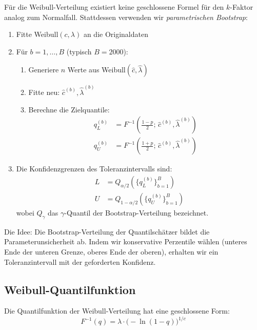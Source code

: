 \documentclass[10pt,a4paper,twocolumn]{article}
\theoremstyle{definition}
\newcommand{\TI}{Toleranzintervall}
\begin{document}
Für die Weibull-Verteilung existiert keine geschlossene Formel für
den $k$-Faktor analog zum Normalfall. Stattdessen verwenden wir
\emph{parametrischen Bootstrap}:

\begin{enumerate}[nosep,leftmargin=*]
    \item Fitte Weibull$(c, \lambda)$ an die Originaldaten
    \item Für $b = 1, \ldots, B$ (typisch $B = 2000$):
    \begin{enumerate}[nosep]
        \item Generiere $n$ Werte aus Weibull$(\hat{c}, \hat{\lambda})$
        \item Fitte neu: $\hat{c}^{(b)}, \hat{\lambda}^{(b)}$
        \item Berechne die Zielquantile:
            \begin{align}
                q_L^{(b)} &= F^{-1}\!\left(\frac{1-p}{2};\,
                    \hat{c}^{(b)}, \hat{\lambda}^{(b)}\right) \\
                q_U^{(b)} &= F^{-1}\!\left(\frac{1+p}{2};\,
                    \hat{c}^{(b)}, \hat{\lambda}^{(b)}\right)
            \end{align}
    \end{enumerate}
    \item Die Konfidenzgrenzen des \TI{}s sind:
        \begin{align}
            L &= Q_{\alpha/2}\!\left(\{q_L^{(b)}\}_{b=1}^B\right) \\
            U &= Q_{1-\alpha/2}\!\left(\{q_U^{(b)}\}_{b=1}^B\right)
            \label{eq:bootstrap_bounds}
        \end{align}
        wobei $Q_\gamma$ das $\gamma$-Quantil der Bootstrap-Verteilung bezeichnet.
\end{enumerate}

Die Idee: Die Bootstrap-Verteilung der Quantilschätzer bildet die
Parameterunsicherheit ab. Indem wir konservative Perzentile wählen
(unteres Ende der unteren Grenze, oberes Ende der oberen), erhalten
wir ein \TI{} mit der geforderten Konfidenz.

\subsection{Weibull-Quantilfunktion}

Die Quantilfunktion der Weibull-Verteilung hat eine geschlossene Form:
\begin{equation}
    F^{-1}(q) = \lambda \cdot \big(-\ln(1-q)\big)^{1/c}
    \label{eq:weibull_quantile}
\end{equation}
\end{document}
